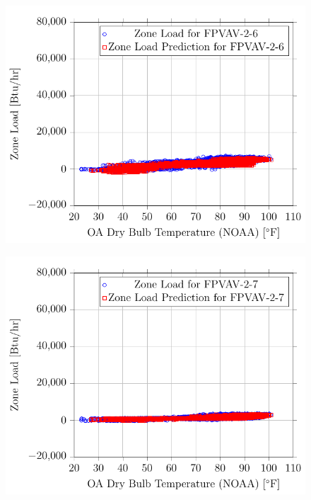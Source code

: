 \begin{figure}
\centering
\includegraphics{Plots/17/2017-06-27-1325-BtuhrvsOADryBulbTemperatureNOAAF.pdf}
\caption{}
\label{fig:2017-06-27-1325-BtuhrvsOADryBulbTemperatureNOAAF}
\end{figure}


\begin{figure}
\centering
\includegraphics{Plots/18/2017-06-27-1328-BtuhrvsOADryBulbTemperatureNOAAF.pdf}
\caption{}
\label{fig:2017-06-27-1328-BtuhrvsOADryBulbTemperatureNOAAF}
\end{figure}

